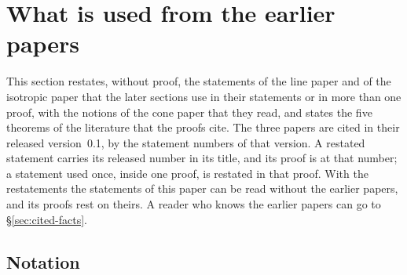 \section{What is used from the earlier papers}\label{sec:line}

This section restates, without proof, the statements of the line paper
 and of the isotropic paper  that the
later sections use in their statements or in more than one proof, with the notions of the cone
paper  that they read, and states the five theorems of the literature
that the proofs cite. The three papers are cited in their released
version~0.1, by the statement numbers of that version. A restated statement carries its released
number in its title, and its proof is at that number; a statement used once, inside one proof, is
restated in that proof. With the restatements the statements of this paper can be read without
the earlier papers, and its proofs rest on theirs. A reader who knows the earlier papers can go to
\S\ref{sec:cited-facts}.

\subsection{Notation}\label{sec:notation}

